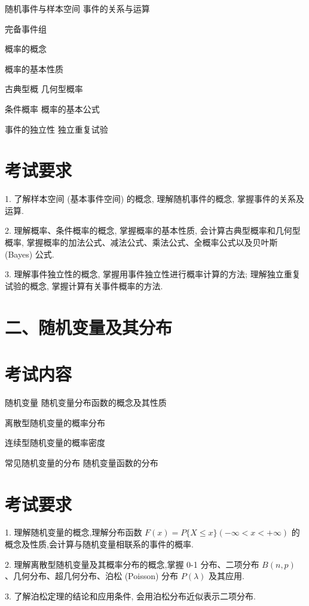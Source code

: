 \documentclass[10pt]{article}
\begin{document}
随机事件与样本空间 事件的关系与运算 

完备事件组 

概率的概念 

概率的基本性质 

古典型概 几何型概率 

条件概率 概率的基本公式 

事件的独立性 独立重复试验

\section*{考试要求}

1. 了解样本空间 (基本事件空间) 的概念, 理解随机事件的概念, 掌握事件的关系及运算.

2. 理解概率、条件概率的概念, 掌握概率的基本性质, 会计算古典型概率和几何型概率, 掌握概率的加法公式、减法公式、乘法公式、全概率公式以及贝叶斯 (Bayes) 公式.

3. 理解事件独立性的概念, 掌握用事件独立性进行概率计算的方法; 理解独立重复试验的概念, 掌握计算有关事件概率的方法.

\section*{二、随机变量及其分布}

\section*{考试内容}

随机变量 随机变量分布函数的概念及其性质 

离散型随机变量的概率分布 

连续型随机变量的概率密度 

常见随机变量的分布 随机变量函数的分布

\section*{考试要求}

1. 理解随机变量的概念,理解分布函数 \(F\left( x\right)  = P\{ X \leq  x\} \left( {-\infty  < x <  + \infty }\right)\) 的概念及性质,会计算与随机变量相联系的事件的概率.

2. 理解离散型随机变量及其概率分布的概念,掌握 0-1 分布、二项分布 \(B\left( {n,p}\right)\) 、几何分布、超几何分布、泊松 (Poisson) 分布 \(P\left( \lambda \right)\) 及其应用.

3. 了解泊松定理的结论和应用条件, 会用泊松分布近似表示二项分布.
\end{document}

